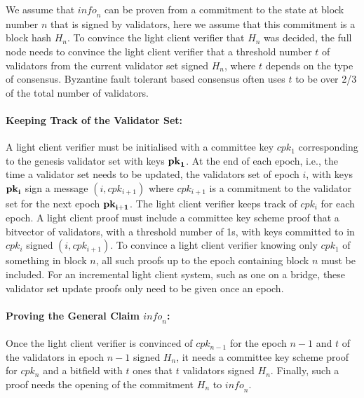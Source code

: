 We assume that $\mathit{info}_n$ can be proven from a commitment to the state at block number $n$ that is signed by validators, here we assume that this commitment is a block hash $H_n$. To convince the light client verifier that $H_n$  was decided, the full node needs to convince the light client verifier that a threshold number $t$ of validators from the current validator set signed $H_n$, where $t$ depends on the type of consensus. Byzantine fault tolerant based consensus often uses $t$ to be over 2/3 of the total number of validators.

\noindent\paragraph{Keeping Track of the Validator Set:} A light client verifier must be initialised with a committee key $cpk_1$ corresponding to the genesis validator set with keys $\bf{pk}_1$. At the end of each epoch, i.e., the time a validator set needs to be updated, the validators set of epoch $i$, with keys $\bf{pk}_i$ sign a message $(i,cpk_{i+1})$ where $cpk_{i+1}$ is a commitment to the validator set for the next epoch $\bf{pk}_{i+1}$. The light client verifier keeps track of $cpk_i$ for each epoch. A light client proof must include a committee key scheme proof that a bitvector of validators, with a threshold number of 1s, with keys committed to in $cpk_i$ signed $(i,cpk_{i+1})$. To convince a light client verifier knowing only $cpk_1$ of something in block $n$, all such proofs up to the epoch containing block $n$ must be included. For an incremental light client system, such as one on a bridge, these validator set update proofs only need to be given once an epoch.
\vspace{-0.05in}

\noindent\paragraph{Proving the General Claim $\mathit{info}_n$:} Once the light client verifier is convinced of $cpk_{n-1}$ for the epoch $n-1$ and $t$ of the validators in epoch $n-1$ signed $H_n$, it needs a committee key scheme proof for $cpk_n$ and a bitfield with $t$ ones that $t$ validators signed $H_n$. Finally, such a proof needs the opening of the commitment $H_n$ to $\mathit{info}_n$.
\vspace{-0.08in}

